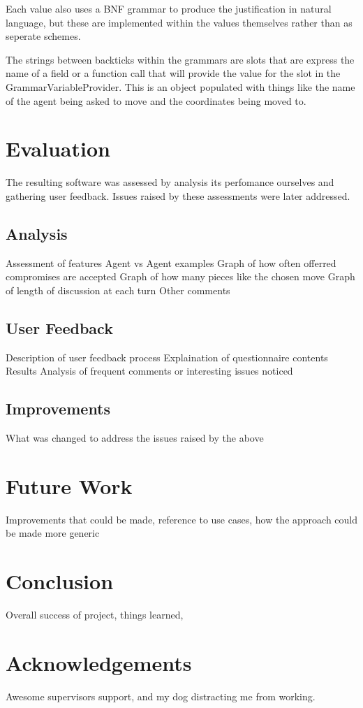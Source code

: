 \documentclass[conference]{IEEEtran}
\begin{document}
Each value also uses a BNF grammar to produce the justification in natural language, but these are implemented within the values themselves rather than as seperate schemes.

The strings between backticks within the grammars are slots that are express the name of a field or a function call that will provide the value for the slot in the GrammarVariableProvider. This is an object populated with things like the name of the agent being asked to move and the coordinates being moved to.

\section{Evaluation}

The resulting software was assessed by analysis its perfomance ourselves and gathering user feedback. Issues raised by these assessments were later addressed.

\subsection{Analysis}

Assessment of features
Agent vs Agent examples
Graph of how often offerred compromises are accepted
Graph of how many pieces like the chosen move
Graph of length of discussion at each turn
Other comments

\subsection{User Feedback}

Description of user feedback process
Explaination of questionnaire contents
Results
Analysis of frequent comments or interesting issues noticed

\subsection{Improvements}

What was changed to address the issues raised by the above

\section{Future Work}

Improvements that could be made, reference to use cases, how the approach could be made more generic

\section{Conclusion}

Overall success of project, things learned, 

\section{Acknowledgements}

Awesome supervisors support, and my dog distracting me from working.




\vspace{12pt}
\end{document}
